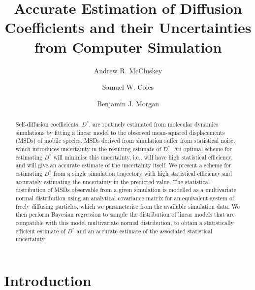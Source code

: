 \documentclass[reprint,superscriptaddress,nobibnotes,amsmath,amssymb,aps,prx,hidelinks]{revtex4-2}
\title@column\titleblock@produce
\makeatletter
\newcommand{\papertitle}{Accurate Estimation of Diffusion Coefficients and their Uncertainties from Computer Simulation}
\newcommand{\D}{\ensuremath{D^*}}
\def\maketitle{
\@author@finish
\title@column\titleblock@produce
\suppressfloats[t]}
\makeatother
\begin{document}
\let\oldaddcontentsline\addcontentsline%
\renewcommand{\addcontentsline}[3]{}

\title{\papertitle}

\author{Andrew R. McCluskey}
\author{Samuel W. Coles}
\author{Benjamin J. Morgan}

\begin{abstract}
    Self-diffusion coefficients, $\D$, are routinely estimated from molecular dynamics simulations by fitting a linear model to the observed mean-squared displacements (MSDs) of mobile species.
    MSDs derived from simulation suffer from statistical noise, which introduces uncertainty in the resulting estimate of $\D$.
    An optimal scheme for estimating $\D$ will minimise this uncertainty, i.e., will have high statistical efficiency, and will give an accurate estimate of the uncertainty itself.
    We present a scheme for estimating $\D$ from a single simulation trajectory with high statistical efficiency and accurately estimating the uncertainty in the predicted value.
    The statistical distribution of MSDs observable from a given simulation is modelled as a multivariate normal distribution using an analytical covariance matrix for an equivalent system of freely diffusing particles, which we parameterise from the available simulation data. 
    We then perform Bayesian regression to sample the distribution of linear models that are compatible with this model multivariate normal distribution, to obtain a statistically efficient estimate of $D^*$ and an accurate estimate of the associated statistical uncertainty.
\end{abstract}

\maketitle 

\section{Introduction}
\end{document}

